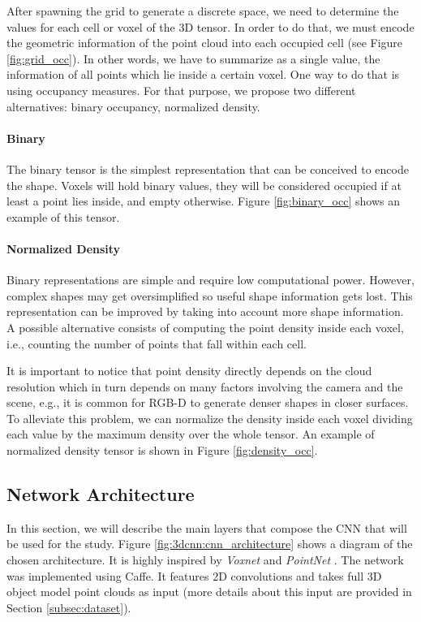 After spawning the grid to generate a discrete space, we need to determine the values for each cell or voxel of the \acs{3D} tensor. In order to do that, we must encode the geometric information of the point cloud into each occupied cell (see Figure \ref{fig:grid_occ}). In other words, we have to summarize as a single value, the information of all points which lie inside a certain voxel. One way to do that is using occupancy measures. For that purpose, we propose two different alternatives: binary occupancy, normalized density.

\paragraph{Binary}

The binary tensor is the simplest representation that can be conceived to encode the shape. Voxels will hold binary values, they will be considered occupied if at least a point lies inside, and empty otherwise. Figure \ref{fig:binary_occ} shows an example of this tensor.

\paragraph{Normalized Density}

Binary representations are simple and require low computational power. However, complex shapes may get oversimplified so useful shape information gets lost. This representation can be improved by taking into account more shape information. A possible alternative consists of computing the point density inside each voxel, i.e., counting the number of points that fall within each cell.

It is important to notice that point density directly depends on the cloud resolution which in turn depends on many factors involving the camera and the scene, e.g., it is common for \acs{RGB-D} to generate denser shapes in closer surfaces. To alleviate this problem, we can normalize the density inside each voxel dividing each value by the maximum density over the whole tensor. An example of normalized density tensor is shown in Figure \ref{fig:density_occ}.

\subsection{Network Architecture}
\label{cha:objrecog:sec:study:subsec:architecture}

In this section, we will describe the main layers that compose the \ac{CNN} that will be used for the study. Figure \ref{fig:3dcnn:cnn_architecture} shows a diagram of the chosen architecture. It is highly inspired by \emph{Voxnet} \cite{Maturana2015} and \emph{PointNet} \cite{Garcia-Garcia2016}. The network was implemented using Caffe. It features \acs{2D} convolutions and takes full \acs{3D} object model point clouds as input (more details about this input are provided in Section \ref{subsec:dataset}).

